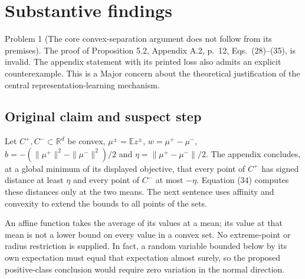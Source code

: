 \documentclass[10pt]{article}
\begin{document}
\section*{Substantive findings}
Problem 1 (The core convex-separation argument does not follow from its premises).  The proof of Proposition 5.2, Appendix A.2, p. 12, Eqs. (28)–(35), is invalid. The appendix statement with its printed loss also admits an explicit counterexample. This is a Major concern about the theoretical justification of the central representation-learning mechanism.\par
\subsection*{Original claim and suspect step}
Let \(C^+,C^-\subset\mathbb R^d\) be convex, \(\mu^\pm=\mathbb E z^\pm\), \(w=\mu^+-\mu^-\), \(b=-(\|\mu^+\|^2-\|\mu^-\|^2)/2\) and \(\eta=\|\mu^+-\mu^-\|/2\). The appendix concludes, at a global minimum of its displayed objective, that every point of \(C^+\) has signed distance at least \(\eta\) and every point of \(C^-\) at most \(-\eta\). Equation (34) computes these distances only at the two means. The next sentence uses affinity and convexity to extend the bounds to all points of the sets.\par
An affine function takes the average of its values at a mean; its value at that mean is not a lower bound on every value in a convex set. No extreme-point or radius restriction is supplied. In fact, a random variable bounded below by its own expectation must equal that expectation almost surely, so the proposed positive-class conclusion would require zero variation in the normal direction.\par
\end{document}
